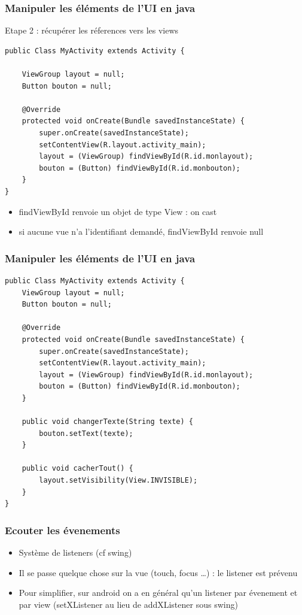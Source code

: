 \documentclass{beamer}
\begin{document}
\begin{frame}[fragile]
\frametitle{Manipuler les éléments de l'UI en java}
Etape 2 : récupérer les réferences vers les views
\begin{lstlisting}
public Class MyActivity extends Activity {

    ViewGroup layout = null;
    Button bouton = null;

    @Override
    protected void onCreate(Bundle savedInstanceState) {
        super.onCreate(savedInstanceState);
        setContentView(R.layout.activity_main);
        layout = (ViewGroup) findViewById(R.id.monlayout);
        bouton = (Button) findViewById(R.id.monbouton);
    }
}
\end{lstlisting}
\begin{itemize}
    \item findViewById renvoie un objet de type View : on cast
    \item si aucune vue n'a l'identifiant demandé, findViewById renvoie null
 \end{itemize}
\end{frame}
\begin{frame}[fragile]
\frametitle{Manipuler les éléments de l'UI en java}
\begin{lstlisting}
public Class MyActivity extends Activity {
    ViewGroup layout = null;
    Button bouton = null;

    @Override
    protected void onCreate(Bundle savedInstanceState) {
        super.onCreate(savedInstanceState);
        setContentView(R.layout.activity_main);
        layout = (ViewGroup) findViewById(R.id.monlayout);
        bouton = (Button) findViewById(R.id.monbouton);
    }
	
    public void changerTexte(String texte) {
        bouton.setText(texte);
    }
	
    public void cacherTout() {
        layout.setVisibility(View.INVISIBLE);
    }
}
\end{lstlisting}
\end{frame}
\begin{frame}[fragile]
\frametitle{Ecouter les évenements}
\begin{itemize}
 \item Système de listeners (cf swing)
 \item Il se passe quelque chose sur la vue (touch, focus \ldots) : le listener
 est prévenu
 \item Pour simplifier, sur android on a en général qu'un listener par évenement
 et par view (setXListener au lieu de addXListener sous swing)
 \end{itemize}
\end{frame}
\end{document}
